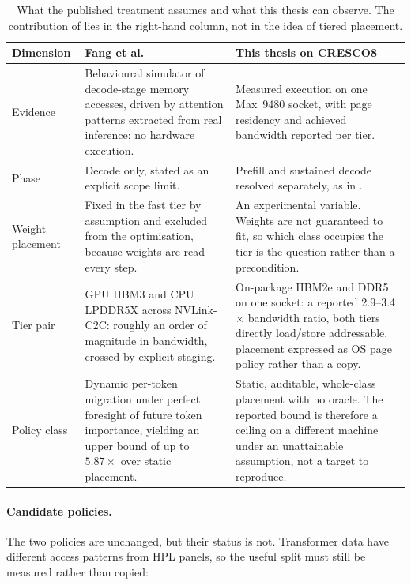 \begin{table}[htbp]
\centering
\small
\tabsetup
\caption{What the published treatment assumes and what this thesis can
observe.  The contribution of  lies in the right-hand
column, not in the idea of tiered placement.}
\label{tab:rq4-delta}
\begin{tabularx}{\textwidth}{@{}P{2.55cm}YY@{}}
\toprule
\headrow
\textbf{Dimension} & \textbf{Fang et al.~\cite{fang2025kvplacement}} &
\textbf{This thesis on CRESCO8} \\
\midrule
Evidence
& Behavioural simulator of decode-stage memory accesses, driven by
  attention patterns extracted from real inference; no hardware
  execution.
& Measured execution on one Max~9480 socket, with page residency and
  achieved bandwidth reported per tier. \\
\addlinespace
Phase
& Decode only, stated as an explicit scope limit.
& Prefill and sustained decode resolved separately, as in
  . \\
\addlinespace
Weight placement
& Fixed in the fast tier by assumption and excluded from the
  optimisation, because weights are read every step.
& An experimental variable.  Weights are not guaranteed to fit, so
  which class occupies the tier is the question rather than a
  precondition. \\
\addlinespace
Tier pair
& GPU HBM3 and CPU LPDDR5X across NVLink-C2C: roughly an order of
  magnitude in bandwidth, crossed by explicit staging.
& On-package HBM2e and DDR5 on one socket: a reported 2.9--3.4\(\times\)
  bandwidth ratio, both tiers directly load/store addressable, placement
  expressed as OS page policy rather than a copy. \\
\addlinespace
Policy class
& Dynamic per-token migration under perfect foresight of future token
  importance, yielding an upper bound of up to \(5.87\times\) over
  static placement.
& Static, auditable, whole-class placement with no oracle.  The
  reported bound is therefore a ceiling on a different machine under an
  unattainable assumption, not a target to reproduce. \\
\bottomrule
\end{tabularx}
\end{table}

\paragraph{Candidate policies.}
The two policies are unchanged, but their status is not.  Transformer
data have different access patterns from HPL panels, so the useful split
must still be measured rather than copied:

